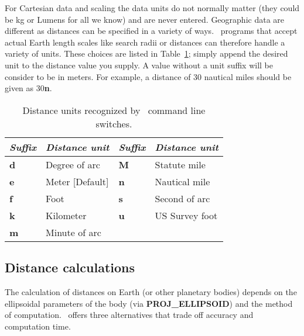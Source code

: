 For Cartesian data and scaling the data units do not normally matter (they could be
kg or Lumens for all we know) and are never entered.  Geographic data are different
as distances can be specified in a variety of ways.  \GMT\ programs that accept actual
Earth length scales like search radii or distances can therefore
handle a variety of units.  These choices are listed in Table~\ref{tbl:distunits};
simply append the desired unit to the distance value you supply.  A value without
a unit suffix will be consider to be in meters.  For example, a distance of
30 nautical miles should be given as 30\textbf{n}.
\begin{table}[H]
\centering
{}%
%
\begin{tabular}{|l|l||l|l|} \hline
\multicolumn{1}{|c|}{\emph{Suffix}} & \multicolumn{1}{c|}{\emph{Distance unit}} & \multicolumn{1}{|c|}{\emph{Suffix}} & \multicolumn{1}{c|}{\emph{Distance unit}} \\ \hline
\textbf{d}	&	Degree of arc	& \textbf{M}	&	Statute mile   \\ \hline
\textbf{e}	&	Meter [Default]	& \textbf{n}	&	Nautical mile  \\ \hline
\textbf{f}	&	Foot 		& \textbf{s}	&	Second of arc  \\ \hline
\textbf{k}	&	Kilometer	& \textbf{u}	&	US Survey foot  \\ \hline
\textbf{m}	&	Minute of arc	& 		&			\\ \hline
\end{tabular}
\caption{Distance units recognized by \gmt\ command line switches.}
\label{tbl:distunits}
\end{table}

\subsection{Distance calculations}

The calculation of distances on Earth (or other planetary bodies) depends on the
ellipsoidal parameters of the body (via {\bf PROJ\_ELLIPSOID}) and the method of computation.  \GMT\ offers
three alternatives that trade off accuracy and computation time.

